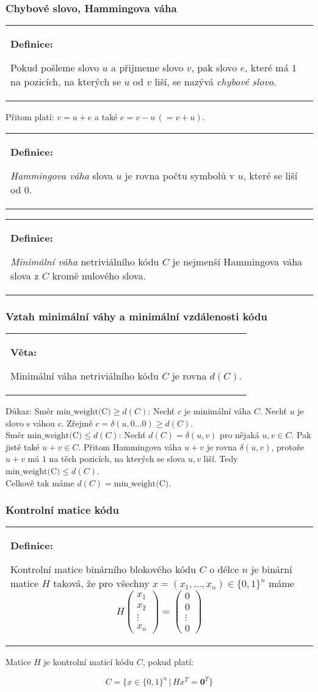 \documentclass{beamer}
\newenvironment{definice}
{
    \begin{center}
    \begin{tabular}{p{9cm}}
    \textbf{Definice:}
}
{
    \end{tabular}
    \end{center}
}
\newenvironment{veta}
{
    \begin{center}
    \begin{tabular}{p{9cm}}
    \textbf{Věta:}
}
{
    \end{tabular}
    \end{center}
}
\newcommand{\sep}{\,|\,}
\newcommand{\emptyline}{\\$\,$\\}
\begin{document}
\begin{frame}[t,fragile]\frametitle{Chybové slovo, Hammingova váha} 
    \begin{definice}
        Pokud pošleme slovo $u$ a přijmeme slovo $v$, pak slovo $e$, které má $1$ na pozicích, na kterých se $u$ od $v$ liší, se nazývá \textit{chybové slovo}.
    \end{definice}

    Přitom platí: $v = u + e$ a také $e = v-u\, (= v+u)$.

    \begin{definice}
    \textit{Hammingova váha} slova $u$ je rovna počtu symbolů v $u$, které se liší od $0$.
    \end{definice}

    \begin{definice}
    \textit{Minimální váha} netriviálního kódu $C$ je nejmenší Hammingova váha slova z $C$ kromě nulového slova.
    \end{definice}
\end{frame}



\begin{frame}[t,fragile]\frametitle{Vztah minimální váhy a minimální vzdálenosti kódu} 
    \begin{veta}
    Minimální váha netriviálního kódu $C$ je rovna $d(C)$.
    \end{veta}

    Důkaz: Směr $\mbox{min\_weight(C)}\ge d(C)$: Nechť $c$ je minimální váha $C$. Nechť $u$ je slovo s váhou $c$. Zřejmě $c=\delta(u, 0\dots0)\ge d(C)$.
\emptyline
    Směr $\mbox{min\_weight(C)}\le d(C)$: Nechť $d(C)=\delta(u,v)$ pro nějaká $u,v\in C$. Pak jistě také $u+v\in C$. Přitom Hammingova váha $u+v$ je rovna $\delta(u,v)$, protože $u+v$ má $1$ na těch pozicích, na kterých se slova $u,v$ liší. Tedy $\mbox{min\_weight(C)}\le d(C)$.
\emptyline
    Celkově tak máme $d(C) = \mbox{min\_weight(C)}$.
\end{frame}


\begin{frame}[t,fragile]\frametitle{Kontrolní matice kódu} 
    \begin{definice}
        Kontrolní matice binárního blokového kódu $C$ o délce $n$ je binární matice $H$ taková, že pro všechny $x=(x_1,\dots, x_n)\in\{0,1\}^n$ máme
$$
H
\begin{pmatrix}
x_1\\
x_2\\
\vdots\\
x_n
\end{pmatrix}
=
\begin{pmatrix}
0\\
0\\
\vdots\\
0
\end{pmatrix}
$$
    \end{definice}

    Matice $H$ je kontrolní maticí kódu $C$, pokud platí:

$$
C=\{x\in\{0,1\}^n\sep Hx^T=\textbf{0}^T\}
$$
\end{frame}
\end{document}

